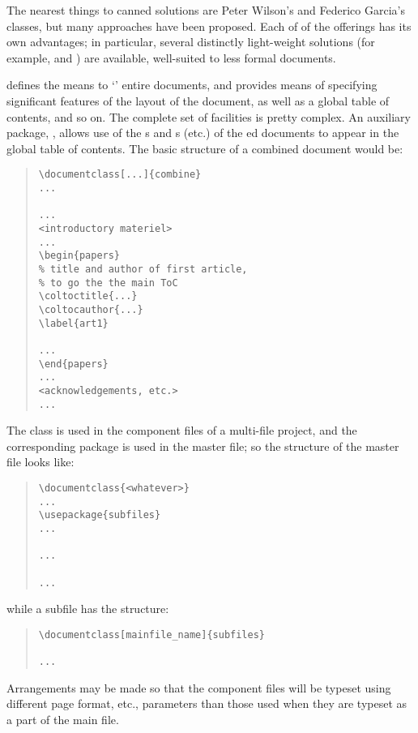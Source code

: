 The nearest things to canned solutions are Peter Wilson's
 and Federico Garcia's  classes, but
many approaches have been proposed.  Each of of the offerings has its
own advantages; in particular, several distinctly light-weight
solutions (for example,  and ) are
available, well-suited to less formal documents.

 defines the means to `' entire documents,
and provides means of specifying significant features of the layout of
the document, as well as a global table of contents, and so on.  The
complete set of facilities is pretty complex.  An auxiliary package,
, allows use of the s and s
(etc.\@) of the ed documents to appear in the global table
of contents.  The basic structure of a combined document would be:
\begin{quote}
\begin{verbatim}
\documentclass[...]{combine}
...

...
<introductory materiel>
...
\begin{papers}
% title and author of first article,
% to go the the main ToC
\coltoctitle{...}
\coltocauthor{...}
\label{art1}

...
\end{papers}
...
<acknowledgements, etc.>
...

\end{verbatim}
\end{quote}

The  class is used in the component files of a multi-file
project, and the corresponding  package is used in the
master file; so the structure of the master file looks like:
\begin{quote}
\begin{verbatim}
\documentclass{<whatever>}
...
\usepackage{subfiles}
...

...

...

\end{verbatim}
\end{quote}
while a subfile has the structure:
\begin{quote}
\begin{verbatim}
\documentclass[mainfile_name]{subfiles}

...

\end{verbatim}
\end{quote}
Arrangements may be made so that the component files will
be typeset using different page format, etc., parameters than those
used when they are typeset as a part of the main file.


